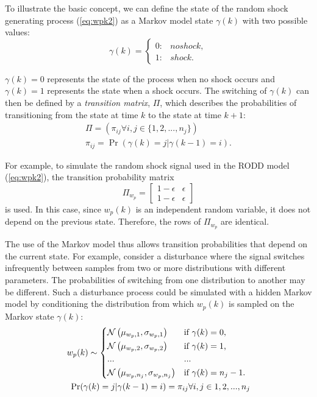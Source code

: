 To illustrate the basic concept, we can define the state of the random shock generating process (\ref{eq:wpk2}) as a Markov model state $\gamma(k)$ with two possible values:
\begin{equation} \label{eq:gamma-k}
	\gamma(k) = 
	\begin{cases*}
		0: & no shock, \\
		1: & shock.
	\end{cases*}
\end{equation}

$\gamma(k)=0$ represents the state of the process when no shock occurs and $\gamma(k)=1$ represents the state when a shock occurs. The switching of $\gamma(k)$ can then be defined by a \textit{transition matrix}, $\Pi$, which describes the probabilities of transitioning from the state at time $k$ to the state at time $k+1$:
\begin{equation} \label{eq:Pi}
	\begin{split}
	\Pi = \left(\pi_{ij} \forall i,j\in \{1,2,...,n_j\}\right) \\
	\pi_{ij}=\Pr\left(\gamma(k)=j|\gamma(k-1)=i\right).
	\end{split}
\end{equation}

For example, to simulate the random shock signal used in the RODD model (\ref{eq:wpk2}), the transition probability matrix
\begin{equation} \label{eq:Pi-RODD-step}
	\Pi_{w_{p}} = \begin{bmatrix}
	1-\epsilon & \epsilon \\
	1-\epsilon & \epsilon
	\end{bmatrix}
\end{equation}
is used. In this case, since $w_{p}(k)$ is an independent random variable, it does not depend on the previous state. Therefore, the rows of $\Pi_{w_{p}}$ are identical.

The use of the Markov model thus allows transition probabilities that depend on the current state. For example, consider a disturbance where the signal switches infrequently between samples from two or more distributions with different parameters. The probabilities of switching from one distribution to another may be different. Such a disturbance process could be simulated with a hidden Markov model by conditioning the distribution from which $w_p(k)$ is sampled on the Markov state $\gamma(k)$:
\begin{equation} \label{eq:mog-example}
	\begin{split}
		w_p(k) \sim 
		\begin{cases*}
			\mathcal{N}\left(\mu_{w_p,1}, \sigma_{w_p,1}\right) & if $\gamma(k)=0$, \\
			\mathcal{N}\left(\mu_{w_p,2}, \sigma_{w_p,2}\right) & if $\gamma(k)=1$, \\
			... & ...\\
			\mathcal{N}\left(\mu_{w_p,n_j}, \sigma_{w_p,n_j}\right) & if $\gamma(k)=n_j-1$.
		\end{cases*} \\
	\Pr(\gamma(k)=j|\gamma(k-1)=i)=\pi_{ij} \forall i,j \in {1,2,...,n_j}
	\end{split}
\end{equation}

